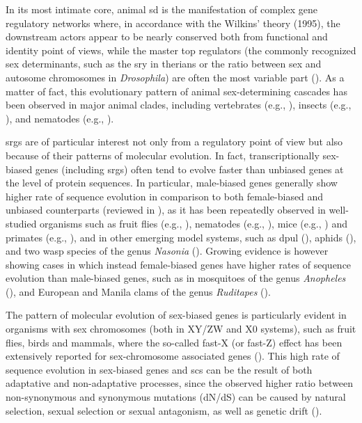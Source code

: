 \documentclass[../main.tex]{subfiles}
\begin{document}
In its most intimate core, animal \gls{sd} is the manifestation of complex gene regulatory networks where, in accordance with the Wilkins’ theory (1995), the downstream actors appear to be nearly conserved both from functional and identity point of views, while the master top regulators (the commonly recognized sex determinants, such as the \gls{sry} in therians or the ratio between sex and autosome chromosomes in \textit{Drosophila}) are often the most variable part (\textbf{\cite{beukeboom2014evolution}}). As a matter of fact, this evolutionary pattern of animal sex-determining cascades has been observed in major animal clades, including vertebrates (e.g., \textbf{\cite{marshall2010homologies}}), insects (e.g., \textbf{\cite{verhulst2010insect}}), and nematodes (e.g., \textbf{\cite{stothard2003sex}}).

\Glspl{srg} are of particular interest not only from a regulatory point of view but also because of their patterns of molecular evolution. In fact, transcriptionally sex-biased genes (including \glspl{srg}) often tend to evolve faster than unbiased genes at the level of protein sequences. In particular, male-biased genes generally show higher rate of sequence evolution in comparison to both female-biased and unbiased counterparts (reviewed in \textbf{\cite{parsch2013evolutionary,grath2016sex}}), as it has been repeatedly observed in well-studied organisms such as fruit flies (e.g., \textbf{\cite{meisel2013faster}}), nematodes (e.g., \textbf{\cite{cutter2005sexual}}), mice (e.g., \textbf{\cite{kousathanas2014faster}}) and primates (e.g., \textbf{\cite{khaitovich2005parallel}}), and in other emerging model systems, such as \gls{dpul} (\textbf{\cite{eads2007profiling}}), aphids (\textbf{\cite{purandare2014accelerated}}), and two wasp species of the genus \textit{Nasonia} (\textbf{\cite{wang2015nasonia}}). Growing evidence is however showing cases in which instead female-biased genes have higher rates of sequence evolution than male-biased genes, such as in mosquitoes of the genus \textit{Anopheles} (\textbf{\cite{papa2017anopheles}}), and European and Manila clams of the genus \textit{Ruditapes} (\textbf{\cite{ghiselli2018comparative}}).

The pattern of molecular evolution of sex-biased genes is particularly evident in organisms with sex chromosomes (both in XY/ZW and X0 systems), such as fruit flies, birds and mammals, where the so-called fast-X (or fast-Z) effect has been extensively reported for sex-chromosome associated genes (\textbf{\cite{vicoso2006evolutionXchrom,meisel2013faster,mank2007fastZ}}). This high rate of sequence evolution in sex-biased genes and \glspl{sc} can be the result of both adaptative and non-adaptative processes, since the observed higher ratio between non-synonymous and synonymous mutations (dN/dS) can be caused by natural selection, sexual selection or sexual antagonism, as well as genetic drift (\textbf{\cite{vicoso2006evolutionXchrom,parsch2013evolutionary,meisel2013faster,grath2016sex}}).
\end{document}
